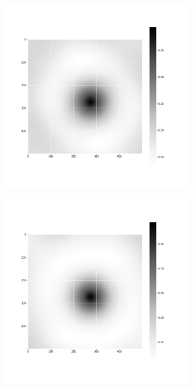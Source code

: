 \documentclass[12pt, a4paper]{report}
\begin{document}
\begin{figure}[H]
\centering
\begin{subfigure}{.32\textwidth}
  \centering
  \includegraphics[width=0.9\textwidth]{Pictures/images9/iso_image_03_560.png}
  \label{img:microstrImg}
\end{subfigure}
\begin{subfigure}{.32\textwidth}
  \centering
  \includegraphics[width=0.9\textwidth]{Pictures/images9/iso_image_04_560.png}

\end{subfigure}
\end{figure}
\end{document}
